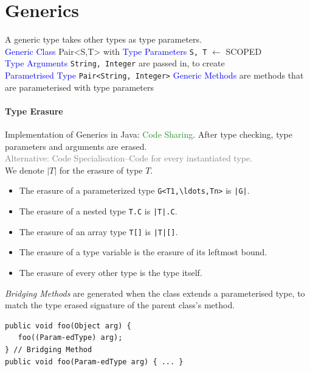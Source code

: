 \section{Generics}
A generic type takes other types as type parameters.\\
\textcolor{Blue}{Generic Class} Pair<S,T> with \textcolor{Blue}{Type
Parameters} \verb|S, T| \textcolor{Bittersweet}{$\leftarrow$ SCOPED}\\
\textcolor{Blue}{Type Arguments} \verb|String, Integer| are passed in, to
create\\
\textcolor{Blue}{Parametrised Type} \verb|Pair<String, Integer>|
\textcolor{Blue}{Generic Methods} are methods that are parameterised with type
parameters
\paragraph{Type Erasure}
Implementation of Generics in Java: \textcolor{ForestGreen}{Code Sharing}.
After type checking, type parameters and arguments are erased.\\
\textcolor{Gray}{Alternative: Code Specialisation–Code for every
instantiated type.}\\
We denote $|T|$ for the erasure of type $T$.
\begin{itemize}
  \item The erasure of a parameterized type \verb$G<T1,\ldots,Tn>$ is \verb$|G|$.
  \item The erasure of a nested type \verb$T.C$ is \verb,|T|.C,.
  \item The erasure of an array type \verb.T[]. is \verb+|T|[]+.
  \item The erasure of a type variable is the erasure of its leftmost bound.
  \item The erasure of every other type is the type itself.
\end{itemize}
\emph{Bridging Methods} are generated when the class extends a parameterised
type, to match the type erased signature of the parent class's method.
\begin{verbatim}
public void foo(Object arg) {
   foo((Param-edType) arg);
} // Bridging Method
public void foo(Param-edType arg) { ... }
\end{verbatim}
